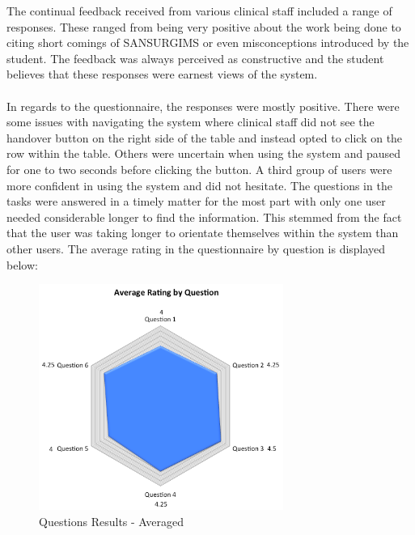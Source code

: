 The continual feedback received from various clinical staff included a range of responses. These ranged from being very positive about the work being done to citing short comings of SANSURGIMS or even misconceptions introduced by the student. The feedback was always perceived as constructive and the student believes that these responses were earnest views of the system. 
\\ \\
In regards to the questionnaire, the responses were mostly positive. There were some issues with navigating the system where clinical staff did not see the handover button on the right side of the table and instead opted to click on the row within the table. Others were uncertain when using the system and paused for one to two seconds before clicking the button. A third group of users were more confident in using the system and did not hesitate. The questions in the tasks were answered in a timely matter for the most part with only one user needed considerable longer to find the information. This stemmed from the fact that the user was taking longer to orientate themselves within the system than other users. The average rating in the questionnaire by question is displayed below:

\begin{figure}[hp]
				\centering
				\includegraphics[scale=1.0, width=80mm]{Images/Evaluation-Results}
				\caption{Questions Results - Averaged}
\end{figure}

\newpage
